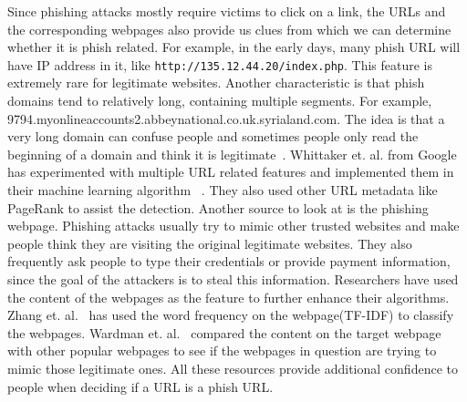 Since phishing attacks mostly require victims to click on a link, the URLs 
and the corresponding webpages also provide us clues from which we can 
determine whether it is phish related. For example, in the early days, many
phish URL will have IP address in it, like \texttt{http://135.12.44.20/index.php}. This feature is extremely rare for
legitimate websites. Another characteristic is that phish domains tend to
relatively long, containing multiple segments. For example, 9794.myonlineaccounts2.abbeynational.co.uk.syrialand.com. The idea is that
a very long domain can confuse people and sometimes people only read the 
beginning of a domain and think it is legitimate~\cite{wu2006security}.
Whittaker et. al. from Google has experimented with multiple URL related
features and implemented them in their machine learning algorithm
~\cite{whittaker2010large}. They also used other URL metadata like PageRank
to assist the detection. Another source to look at is the phishing
webpage. Phishing attacks usually try to mimic other trusted websites and
make people think they are visiting the original legitimate websites. They
also frequently ask people to type their credentials or provide payment
information, since the goal of the attackers is to steal this information.
Researchers have used the content of the webpages as the feature to further
enhance their algorithms. Zhang et. al.~\cite{zhang2007cantina} has used 
the word frequency on the webpage(TF-IDF) to classify the webpages. Wardman 
et. al.~\cite{wardman2008automating} compared the content on the target webpage
with other popular webpages to see if the webpages in question are trying
to mimic those legitimate ones. All these resources provide additional
confidence to people when deciding if a URL is a phish URL.